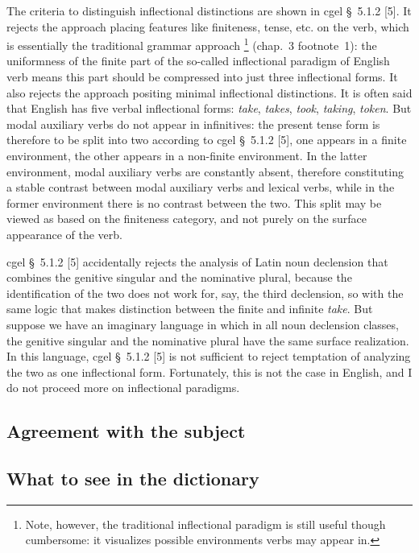 \documentclass{article}
\newcommand*{\citesec}[1]{\S~{#1}}
\newcommand*{\citechap}[1]{chap.~{#1}}
\newcommand*{\citefootnote}[1]{footnote~{#1}}
\newcommand*{\corpus}[1]{\emph{#1}}
\begin{document}
The criteria to distinguish inflectional distinctions are shown in \ac{cgel} \citesec{5.1.2} [5].
It rejects the approach placing features like finiteness, tense, etc. on the verb,
which is essentially the traditional grammar approach%
\footnote{
    Note, however, the traditional inflectional paradigm is still useful though cumbersome:
    it visualizes possible environments verbs may appear in.
} (\citechap{3} \citefootnote{1}):
the uniformness of the finite part of the so-called inflectional paradigm of English verb
means this part should be compressed into just three inflectional forms.
It also rejects the approach positing minimal inflectional distinctions.
It is often said that English has five verbal inflectional forms:
\corpus{take}, \corpus{takes}, \corpus{took}, \corpus{taking}, \corpus{token}. 
But modal auxiliary verbs do not appear in infinitives:
the present tense form is therefore to be split into two
according to \ac{cgel} \citesec{5.1.2} [5],
one appears in a finite environment,
the other appears in a non-finite environment.
In the latter environment, modal auxiliary verbs are constantly absent,
therefore constituting a stable contrast between modal auxiliary verbs and lexical verbs,
while in the former environment there is no contrast between the two.
This split may be viewed as based on the finiteness category,
and not purely on the surface appearance of the verb.

\ac{cgel} \citesec{5.1.2} [5] accidentally rejects the analysis of Latin noun declension
that combines the genitive singular and the nominative plural,
because the identification of the two does not work for, say, the third declension,
so with the same logic that makes distinction between the finite and infinite \corpus{take}.
But suppose we have an imaginary language in which in all noun declension classes,
the genitive singular and the nominative plural have the same surface realization.
In this language, \ac{cgel} \citesec{5.1.2} [5] is not sufficient 
to reject temptation of analyzing the two as one inflectional form.
Fortunately, this is not the case in English, and I do not proceed more on 
inflectional paradigms.

\subsection{Agreement with the subject}\label{sec:verb-agreement}

\subsection{What to see in the dictionary}\label{sec:verb-dict}
\end{document}
